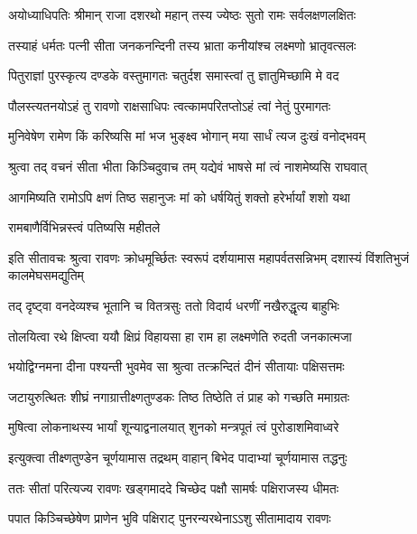 
\twolineshloka
{अयोध्याधिपतिः श्रीमान् राजा दशरथो महान्}
{तस्य ज्येष्ठः सुतो रामः सर्वलक्षणलक्षितः} %

\twolineshloka
{तस्याहं धर्मतः पत्नी सीता जनकनन्दिनी}
{तस्य भ्राता कनीयांश्च लक्ष्मणो भ्रातृवत्सलः} %

\twolineshloka
{पितुराज्ञां पुरस्कृत्य दण्डके वस्तुमागतः}
{चतुर्दश समास्त्वां तु ज्ञातुमिच्छामि मे वद} %


\twolineshloka
{पौलस्त्यतनयोऽहं तु रावणो राक्षसाधिपः}
{त्वत्कामपरितप्तोऽहं त्वां नेतुं पुरमागतः} %

\twolineshloka
{मुनिवेषेण रामेण किं करिष्यसि मां भज}
{भुङ्क्ष्व भोगान् मया सार्धं त्यज दुःखं वनोद्भवम्} %

\twolineshloka
{श्रुत्वा तद् वचनं सीता भीता किञ्चिदुवाच तम्}
{यद्येवं भाषसे मां त्वं नाशमेष्यसि राघवात्} %

\twolineshloka
{आगमिष्यति रामोऽपि क्षणं तिष्ठ सहानुजः}
{मां को धर्षयितुं शक्तो हरेर्भार्यां शशो यथा} %

\onelineshloka
{रामबाणैर्विभिन्नस्त्वं पतिष्यसि महीतले} %


\threelineshloka
{इति सीतावचः श्रुत्वा रावणः क्रोधमूर्च्छितः}
{स्वरूपं दर्शयामास महापर्वतसन्निभम्}
{दशास्यं विंशतिभुजं कालमेघसमद्युतिम्} %

\twolineshloka
{तद् दृष्ट्वा वनदेव्यश्च भूतानि च वितत्रसुः}
{ततो विदार्य धरणीं नखैरुद्धृत्य बाहुभिः} %

\twolineshloka
{तोलयित्वा रथे क्षिप्त्वा ययौ क्षिप्रं विहायसा}
{हा राम हा लक्ष्मणेति रुदती जनकात्मजा} %

\twolineshloka
{भयोद्विग्नमना दीना पश्यन्ती भुवमेव सा}
{श्रुत्वा तत्क्रन्दितं दीनं सीतायाः पक्षिसत्तमः} %

\twolineshloka
{जटायुरुत्थितः शीघ्रं नगाग्रात्तीक्ष्णतुण्डकः}
{तिष्ठ तिष्ठेति तं प्राह को गच्छति ममाग्रतः} %

\twolineshloka
{मुषित्वा लोकनाथस्य भार्यां शून्याद्वनालयात्}
{शुनको मन्त्रपूतं त्वं पुरोडाशमिवाध्वरे} %

\twolineshloka
{इत्युक्त्वा तीक्ष्णतुण्डेन चूर्णयामास तद्रथम्}
{वाहान् बिभेद पादाभ्यां चूर्णयामास तद्धनुः} %

\twolineshloka
{ततः सीतां परित्यज्य रावणः खड्गमाददे}
{चिच्छेद पक्षौ सामर्षः पक्षिराजस्य धीमतः} %

\twolineshloka
{पपात किञ्चिच्छेषेण प्राणेन भुवि पक्षिराट्}
{पुनरन्यरथेनाऽऽशु सीतामादाय रावणः} %

